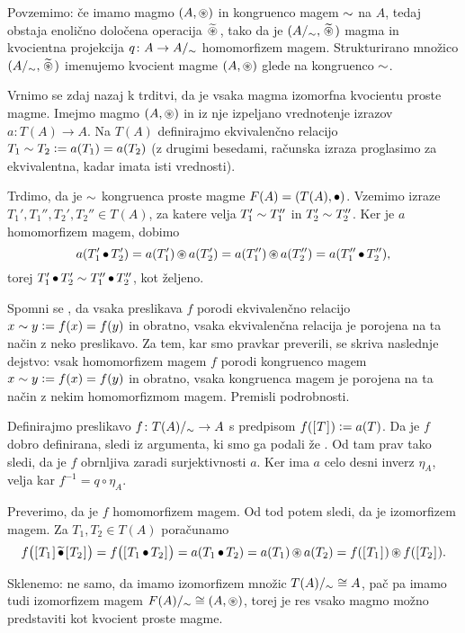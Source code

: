 Povzemimo: če imamo magmo $(A, \mathop{\circledast}\nolimits)$ in kongruenco magem $\sim$ na $A$, tedaj obstaja enolično določena operacija $\;\!\widetilde{\mathop{\circledast}\nolimits}\;\!$, tako da je $(A/_\sim, \;\!\widetilde{\mathop{\circledast}\nolimits}\;\!)$ magma in kvocientna projekcija $q\colon A \to A/_\sim$ homomorfizem magem. Strukturirano množico $(A/_\sim, \;\!\widetilde{\mathop{\circledast}\nolimits}\;\!)$ imenujemo kvocient magme $(A, \mathop{\circledast}\nolimits)$ glede na kongruenco $\sim$.

Vrnimo se zdaj nazaj k trditvi, da je vsaka magma izomorfna kvocientu proste magme. Imejmo magmo $(A, \mathop{\circledast}\nolimits)$ in iz nje izpeljano vrednotenje izrazov $a\colon T(A) \to A$. Na $T(A)$ definirajmo ekvivalenčno relacijo $T_1 \sim T_2 \mathrel{\mathop:}= a(T_1) = a(T_2)$ (z drugimi besedami, računska izraza proglasimo za ekvivalentna, kadar imata isti vrednosti).

Trdimo, da je $\sim$ kongruenca proste magme $F(A) = (T(A), \mathop{\bullet}\nolimits)$. Vzemimo izraze $T_1', T_1'', T_2', T_2'' \in T(A)$, za katere velja $T_1' \sim T_1''$ in $T_2' \sim T_2''$. Ker je $a$ homomorfizem magem, dobimo
\[a(T_1' \mathop{\bullet}\nolimits T_2') = a(T_1') \mathop{\circledast}\nolimits a(T_2') = a(T_1'') \mathop{\circledast}\nolimits a(T_2'') = a(T_1'' \mathop{\bullet}\nolimits T_2''),\]
torej $T_1' \mathop{\bullet}\nolimits T_2' \sim T_1'' \mathop{\bullet}\nolimits T_2''$, kot željeno.

\begin{naloga}
	Spomni se , da vsaka preslikava $f$ porodi ekvivalenčno relacijo $x \sim y \mathrel{\mathop:}= f(x) = f(y)$ in obratno, vsaka ekvivalenčna relacija je porojena na ta način z neko preslikavo. Za tem, kar smo pravkar preverili, se skriva naslednje dejstvo: vsak homomorfizem magem $f$ porodi kongruenco magem $x \sim y \mathrel{\mathop:}= f(x) = f(y)$ in obratno, vsaka kongruenca magem je porojena na ta način z nekim homomorfizmom magem. Premisli podrobnosti.
\end{naloga}

Definirajmo preslikavo $f\colon T(A)/_\sim \to A$ s predpisom $f([\:\!{T}\:\!]_{}) \mathrel{\mathop:}= a(T)$. Da je $f$ dobro definirana, sledi iz argumenta, ki smo ga podali že . Od tam prav tako sledi, da je $f$ obrnljiva zaradi surjektivnosti $a$. Ker ima $a$ celo desni inverz $\eta_A$, velja kar $f^{-1} = q \circ \eta_A$.

Preverimo, da je $f$ homomorfizem magem. Od tod potem sledi, da je izomorfizem magem. Za $T_1, T_2 \in T(A)$ poračunamo
\[f\big(\ec{T_1} \qo{\tconc} \ec{T_2}\big) = f\big(\ec{T_1 \tconc T_2}\big) = a(T_1 \tconc T_2) = a(T_1) \oper a(T_2) = f(\ec{T_1}) \oper f(\ec{T_2}).\]

Sklenemo: ne samo, da imamo izomorfizem množic $T(A)/_\sim \cong A$, pač pa imamo tudi izomorfizem magem $F(A)/_\sim \cong (A, \mathop{\circledast}\nolimits)$, torej je res vsako magmo možno predstaviti kot kvocient proste magme.

